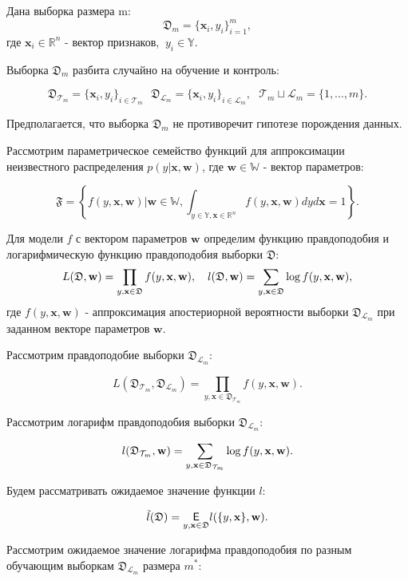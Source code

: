 \documentclass[12pt,twoside]{article}
\begin{document}
Дана выборка размера m:
$$
\mathfrak D_m = \{\textbf{x}_i, y_i\}_{i=1}^m,
$$
где $\textbf{x}_i \in \mathbb{R}^{n}$ - вектор признаков, $~y_i \in \mathbb{Y}$.

Выборка $\mathfrak D_m$ разбита случайно на обучение и контроль:

$$
\mathfrak D_{\mathcal T_m} = \{\textbf{x}_i, y_i\}_{i \in \mathcal T_m} ~~~ \mathfrak D_{\mathcal L_m} = \{\textbf{x}_i, y_i\}_{i \in \mathcal L_m}, ~~~ \mathcal T_m \sqcup \mathcal L_m = \{1, ..., m\}. 
$$

Предполагается, что выборка $\mathfrak D_m$ не противоречит гипотезе порождения данных.

Рассмотрим параметрическое семейство функций для аппроксимации неизвестного распределения $p(y | \textbf{x}, \textbf{w})$, где $\textbf{w} \in \mathbb{W}$ - вектор параметров:

$$
\mathfrak{F} = \left\{f(y, \textbf{x}, \textbf{w}) | \textbf{w} \in \mathbb{W}, \int_{y \in \mathbb{Y}, \textbf{x} \in \mathbb{R}^n} f(y, \textbf{x}, \textbf{w})dyd\textbf{x} = 1\right\}.
$$

Для модели $f$ с вектором параметров $\textbf{w}$ определим функцию правдоподобия и логарифмическую функцию правдоподобия выборки $\mathfrak D$:
$$
L(\mathfrak{D}, \textbf{w}) = \prod_{y, \textbf{x} \in \mathfrak D} f(y, \textbf{x}, \textbf{w}),~~~ l(\mathfrak D, \textbf w) = \sum_{y, \textbf{x} \in \mathfrak D}\log f(y, \textbf{x}, \textbf{w}),
$$
где $f(y, \textbf{x}, \textbf{w})$ - аппроксимация апостериорной вероятности выборки $\mathfrak D_{\mathcal L_m}$ при заданном векторе параметров $\textbf{w}$.

Рассмотрим правдоподобие выборки $\mathfrak D_{\mathcal L_m}$:

$$
L(\mathfrak D_{\mathcal T_m}, \mathfrak D_{\mathcal L_m}) = \prod_{y, \textbf{x} \in \mathfrak D_{\mathcal T_m}} f(y, \textbf{x},  \textbf{w}).
$$

Рассмотрим логарифм правдоподобия выборки $\mathfrak D_{\mathcal L_m}$:

$$
l(\mathfrak D_{\mathcal T_m}, \textbf w) = \sum_{y, \textbf{x} \in \mathfrak D_{\mathcal T_m}}\log f(y, \textbf{x}, \textbf{w}).
$$

Будем рассматривать ожидаемое значение функции $l$:

$$
\tilde{l}(\mathfrak D)  = \underset{y, \textbf{x} \in \mathfrak D}{\mathsf E} l(\{y, \textbf{x}\}, \textbf w).
$$

Рассмотрим ожидаемое значение логарифма правдоподобия по разным обучающим выборкам $\mathfrak D_{\mathcal L_m}$ размера $m^*$:
\end{document}
